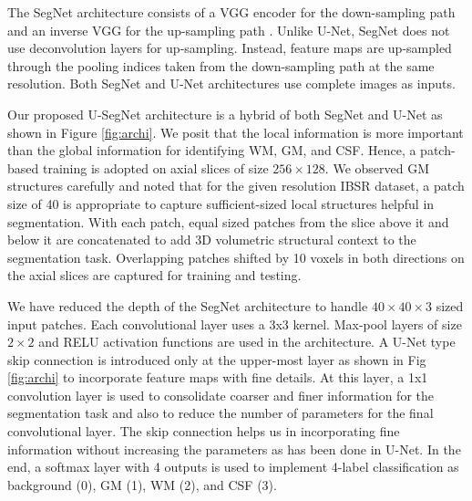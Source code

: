 \documentclass{article}
\begin{document}
The SegNet architecture consists of a VGG encoder for the down-sampling path and an inverse VGG for the up-sampling path \cite{badrinarayanan2017segnet}. Unlike U-Net, SegNet does not use deconvolution layers for up-sampling. Instead, feature maps are up-sampled through the pooling indices taken from the down-sampling path at the same resolution. Both SegNet and U-Net architectures use complete images as inputs.

Our proposed U-SegNet architecture is a hybrid of both SegNet and U-Net as shown in Figure \ref{fig:archi}. We posit that the local information is more important than the global information for identifying WM, GM, and CSF. Hence, a patch-based training is adopted on axial slices of size $256 \times 128$. We observed GM structures carefully and noted that for the given resolution IBSR dataset, a patch size of 40 is appropriate to capture sufficient-sized local structures helpful in segmentation. With each patch, equal sized patches from the slice above it and below it are concatenated to add 3D volumetric structural context to the segmentation task.  Overlapping patches shifted by 10 voxels in both directions on the axial slices are captured for training and testing.

We have reduced the depth of the SegNet architecture to handle $40 \times 40 \times 3$ sized input patches. Each convolutional layer uses a 3x3 kernel. Max-pool layers of size $2 \times 2$ and RELU activation functions are used in the architecture. A U-Net type skip connection is introduced only at the upper-most layer as shown in Fig \ref{fig:archi} to incorporate feature maps with fine details. At this layer, a 1x1 convolution layer is used to consolidate coarser and finer information for the segmentation task and also to reduce the number of parameters for the final convolutional layer. The skip connection helps us in incorporating fine information without increasing the parameters as has been done in U-Net. In the end, a softmax layer with 4 outputs is used to implement 4-label classification as background (0), GM (1), WM (2), and CSF (3).
\end{document}
